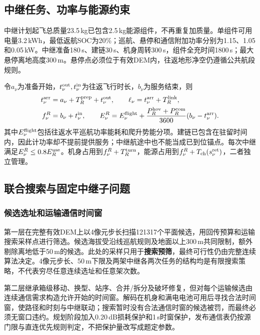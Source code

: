 \documentclass[a4paper]{my_paper}%
\numberwithin{equation}{section}
\theoremstyle{definition}
\begin{document}
\subsection{中继任务、功率与能源约束}
中继计划起飞总质量23.5\,kg已包含2.5\,kg能源组件，不再重复加质量。单组件可用电量3.2\,kWh，最低返航SOC为20\%；巡航、悬停和通信附加功率分别为1.15、1.05和0.05\,kW。中继准备180\,s、建链30\,s、机身周转300\,s，组件全充时间1800\,s；最大悬停离地高度300\,m。悬停点必须位于有效DEM内，往返地形净空仍遵循公共航段规则。

令$a_\nu$为准备开始，$t_\nu^{\rm out},t_\nu^{\rm in}$为往返飞行时长，$b_\nu$为服务结束，则
\begin{align}
 t_\nu^{\rm arr}&=a_\nu+T_R^{\rm prep}+t_\nu^{\rm out},\qquad
 \ell_\nu=t_\nu^{\rm arr}+T_R^{\rm link},\\
 f_\nu^R&=b_\nu+t_\nu^{\rm in},\qquad
 E_\nu^R=E_\nu^{\rm flight}
 +\frac{P_R^{\rm hov}+P_R^{\rm com}}{3600}(b_\nu-t_\nu^{\rm arr}).
 \label{eq:relayenergy}
\end{align}
其中$E_\nu^{\rm flight}$包括往返水平巡航功率能耗和爬升势能分项。建链已包含在驻留时间内，因此计功率却不提前提供服务；中继航途中也不能当成已到位锚点。每次中继满足$E_\nu^R\le0.8E_R^{\rm use}$。机身占用到$f_\nu^R+T_R^{\rm turn}$，能源占用到$f_\nu^R+T_{\rm ch}(s_\nu^{\rm ret})$，二者独立管理。

\subsection{联合搜索与固定中继子问题}
\subsubsection{候选选址和运输通信时间窗}
第一层在完整有效DEM上以4像元步长扫描121317个平面候选，用回传预算和运输搜索采样点进行筛选。候选海拔受沿线巡航规则及地面以上300\,m共同限制，额外剔除离地低于50\,m的候选。此处的采样只用于\textbf{搜索预筛}，最终可行性仍由完整连续算法决定。4像元步长、50\,m下限及两架中继各两次任务的结构均是有限搜索策略，不代表穷尽任意连续选址和任意架次数。

第二层继承箱级移动、换型、站序、合并/拆分及破坏修复，但对每个运输候选由连续通信需求构造允许开始的时间窗。解码在机身和满电电池可用后寻找合法时间窗，使路径和时刻与中继联动；搜索暂时没有合法通信时窗的候选被罚，而最终必须无窗口违约。规划阶段加入0.20\,dB损耗保护和1\,s时窗保护，发布通信表仍按源门限与直连优先规则判定，不把保护量改写成题定参数。
\end{document}
